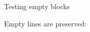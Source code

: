 Testing empty blocks

\begin{sh}
\end{sh}

\begin{foo}
\end{foo}

\begin{foo}
\end{foo}

\begin{foo}
\end{foo}

Empty lines are preserved:

\begin{foo}

\end{foo}

\begin{foo}

\end{foo}
